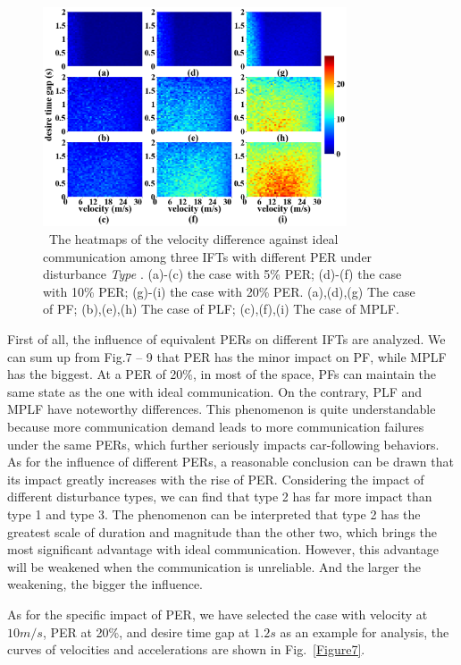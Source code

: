\documentclass[journal]{IEEEtran}
\begin{document}
\begin{figure}
  \includegraphics[width=9cm]{fig_5.3.3.png}
  \caption{~The heatmaps of the velocity difference against ideal communication among three IFTs with different PER under disturbance \textit{Type \uppercase\expandafter{}}. (a)-(c) the case with 5\% PER; (d)-(f) the case with 10\% PER; (g)-(i) the case with 20\% PER. (a),(d),(g) The case of PF; (b),(e),(h) The case of PLF; (c),(f),(i) The case of MPLF.} 
  \label{fig_5.3.3}
\end{figure}



First of all, the influence of equivalent PERs on different IFTs are analyzed. We can sum up from Fig.7 – 9 that PER has the minor impact on PF, while MPLF has the biggest. At a PER of 20\%, in most of the space, PFs can maintain the same state as the one with ideal communication. On the contrary, PLF and MPLF have noteworthy differences. This phenomenon is quite understandable because more communication demand leads to more communication failures under the same PERs, which further seriously impacts car-following behaviors. As for the influence of different PERs, a reasonable conclusion can be drawn that its impact greatly increases with the rise of PER. Considering the impact of different disturbance types, we can find that type 2 has far more impact than type 1 and type 3. The phenomenon can be interpreted that type 2 has the greatest scale of duration and magnitude than the other two, which brings the most significant advantage with ideal communication. However, this advantage will be weakened when the communication is unreliable. And the larger the weakening, the bigger the influence.

As for the specific impact of PER, we have selected the case with velocity at $10 m/s$, PER at 20\%, and desire time gap at $1.2 s$ as an example for analysis, the curves of velocities and accelerations are shown in Fig.~\ref{Figure7}.
\end{document}
